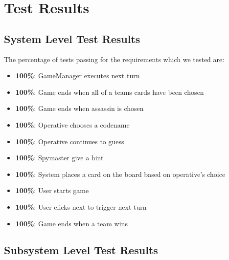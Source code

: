 \documentclass[12pt]{article}
\begin{document}





\section{Test Results}

\subsection{System Level Test Results}
The percentage of tests passing for the requirements which we tested are:
\begin{itemize}
  \item \textbf{100\%}: GameManager executes next turn
  \item \textbf{100\%}: Game ends when all of a teams cards have been chosen
  \item \textbf{100\%}: Game ends when assassin is chosen
  \item \textbf{100\%}: Operative chooses a codename
  \item \textbf{100\%}: Operative continues to guess
  \item \textbf{100\%}: Spymaster give a hint
  \item \textbf{100\%}: System places a card on the board based on operative's choice
  \item \textbf{100\%}: User starts game
  \item \textbf{100\%}: User clicks next to trigger next turn
  \item \textbf{100\%}: Game ends when a team wins
\end{itemize}

\subsection{Subsystem Level Test Results}
\end{document}
